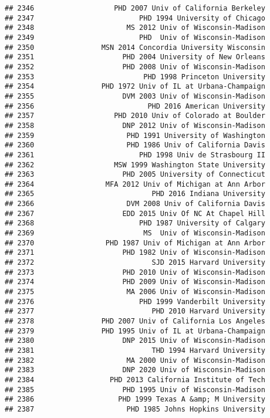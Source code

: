 \documentclass[
]{article}
\begin{document}
\begin{verbatim}
## 2346                   PHD 2007 Univ of California Berkeley
## 2347                         PHD 1994 University of Chicago
## 2348                      MS 2012 Univ of Wisconsin-Madison
## 2349                         PHD  Univ of Wisconsin-Madison
## 2350                MSN 2014 Concordia University Wisconsin
## 2351                     PHD 2004 University of New Orleans
## 2352                     PHD 2008 Univ of Wisconsin-Madison
## 2353                          PHD 1998 Princeton University
## 2354                PHD 1972 Univ of IL at Urbana-Champaign
## 2355                     DVM 2003 Univ of Wisconsin-Madison
## 2356                           PHD 2016 American University
## 2357                   PHD 2010 Univ of Colorado at Boulder
## 2358                     DNP 2012 Univ of Wisconsin-Madison
## 2359                      PHD 1991 University of Washington
## 2360                      PHD 1986 Univ of California Davis
## 2361                         PHD 1998 Univ de Strasbourg II
## 2362                   MSW 1999 Washington State University
## 2363                     PHD 2005 University of Connecticut
## 2364                 MFA 2012 Univ of Michigan at Ann Arbor
## 2365                            PHD 2016 Indiana University
## 2366                      DVM 2008 Univ of California Davis
## 2367                     EDD 2015 Univ Of NC At Chapel Hill
## 2368                         PHD 1987 University of Calgary
## 2369                          MS  Univ of Wisconsin-Madison
## 2370                 PHD 1987 Univ of Michigan at Ann Arbor
## 2371                     PHD 1982 Univ of Wisconsin-Madison
## 2372                            SJD 2015 Harvard University
## 2373                     PHD 2010 Univ of Wisconsin-Madison
## 2374                     PHD 2009 Univ of Wisconsin-Madison
## 2375                      MA 2006 Univ of Wisconsin-Madison
## 2376                         PHD 1999 Vanderbilt University
## 2377                            PHD 2010 Harvard University
## 2378                PHD 2007 Univ of California Los Angeles
## 2379                PHD 1995 Univ of IL at Urbana-Champaign
## 2380                     DNP 2015 Univ of Wisconsin-Madison
## 2381                            THD 1994 Harvard University
## 2382                      MA 2000 Univ of Wisconsin-Madison
## 2383                     DNP 2020 Univ of Wisconsin-Madison
## 2384                  PHD 2013 California Institute of Tech
## 2385                     PHD 1995 Univ of Wisconsin-Madison
## 2386                    PHD 1999 Texas A &amp; M University
## 2387                      PHD 1985 Johns Hopkins University

\end{verbatim}
\end{document}
